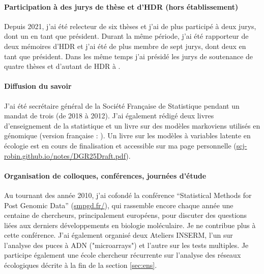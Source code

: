 \paragraph{Participation à des jurys de thèse et d’HDR (hors établissement)}
Depuis 2021, j'ai été relecteur de six thèses et j'ai de plus participé à deux jurys, dont un en tant que président. Durant la même période, j'ai été rapporteur de deux mémoires d'HDR et j'ai été de plus membre de sept jurys, dont deux en tant que président. Dans les même temps j'ai présidé les jurys de soutenance de quatre thèses et d'autant de HDR à \SU.

\paragraph{Diffusion du savoir}
J'ai été secrétaire général de la Société Française de Statistique pendant un mandat de trois (de 2018 à 2012). J'ai également rédigé deux livres d'enseignement de la statistique \cite{DRV99,DBE15} et un livre sur des modèles markoviens utilisés en génomique \cite{RRS06} (version française : \cite{RRS03}). Un livre sur les modèles à variables latente en écologie est en cours de finalisation et accessible sur ma page personnelle (\url{scj-robin.github.io/notes/DGR25Draft.pdf}).

\paragraph{Organisation de colloques, conférences, journées d'étude}
Au tournant des année 2010, j'ai cofondé la conférence “Statistical Methods for Post Genomic Data” (\url{smpgd.fr/}), qui rassemble encore chaque année une centaine de chercheurs, principalement européens, pour discuter des questions liées aux derniers développements en biologie moléculaire. Je ne contribue plus à cette conférence. J'ai également organisé deux Ateliers INSERM, l’un sur l'analyse des puces à ADN ("microarrays") et l'autre sur les tests multiples. Je participe également une école chercheur récurrente sur l’analyse des réseaux écologiques décrite à la fin de la section \ref{sec:ens}. 


